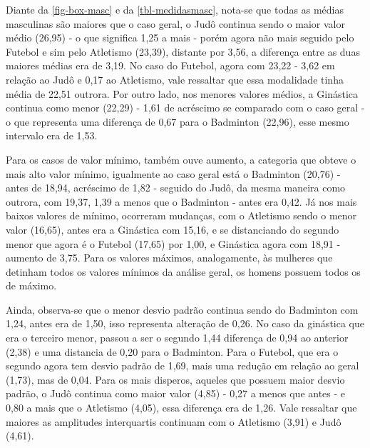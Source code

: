 \documentclass[
]{estat/estat}
\begin{document}
Diante da \ref{fig-box-masc} e da \ref{tbl-medidasmasc}, nota-se que
todas as médias masculinas são maiores que o caso geral, o Judô continua
sendo o maior valor médio (26,95) - o que significa 1,25 a mais - porém
agora não mais seguido pelo Futebol e sim pelo Atletismo (23,39),
distante por 3,56, a diferença entre as duas maiores médias era de 3,19.
No caso do Futebol, agora com 23,22 - 3,62 em relação ao Judô e 0,17 ao
Atletismo, vale ressaltar que essa modalidade tinha média de 22,51
outrora. Por outro lado, nos menores valores médios, a Ginástica
continua como menor (22,29) - 1,61 de acréscimo se comparado com o caso
geral - o que representa uma diferença de 0,67 para o Badminton (22,96),
esse mesmo intervalo era de 1,53.

Para os casos de valor mínimo, também ouve aumento, a categoria que
obteve o mais alto valor mínimo, igualmente ao caso geral está o
Badminton (20,76) - antes de 18,94, acréscimo de 1,82 - seguido do Judô,
da mesma maneira como outrora, com 19,37, 1,39 a menos que o Badminton -
antes era 0,42. Já nos mais baixos valores de mínimo, ocorreram
mudanças, com o Atletismo sendo o menor valor (16,65), antes era a
Ginástica com 15,16, e se distanciando do segundo menor que agora é o
Futebol (17,65) por 1,00, e Ginástica agora com 18,91 - aumento de 3,75.
Para os valores máximos, analogamente, às mulheres que detinham todos os
valores mínimos da análise geral, os homens possuem todos os de máximo.

Ainda, observa-se que o menor desvio padrão continua sendo do Badminton
com 1,24, antes era de 1,50, isso representa alteração de 0,26. No caso
da ginástica que era o terceiro menor, passou a ser o segundo 1,44
diferença de 0,94 ao anterior (2,38) e uma distancia de 0,20 para o
Badminton. Para o Futebol, que era o segundo agora tem desvio padrão de
1,69, mais uma redução em relação ao geral (1,73), mas de 0,04. Para os
mais disperos, aqueles que possuem maior desvio padrão, o Judô continua
como maior valor (4,85) - 0,27 a menos que antes - e 0,80 a mais que o
Atletismo (4,05), essa diferença era de 1,26. Vale ressaltar que maiores
as amplitudes interquartis continuam com o Atletismo (3,91) e Judô
(4,61).

\begin{table}[H]

\caption{\label{tbl-cvmasc}Coeficiente de variação de IMC dos atletas
masculinos dos esportes de interesse}


\end{table}%
\end{document}
